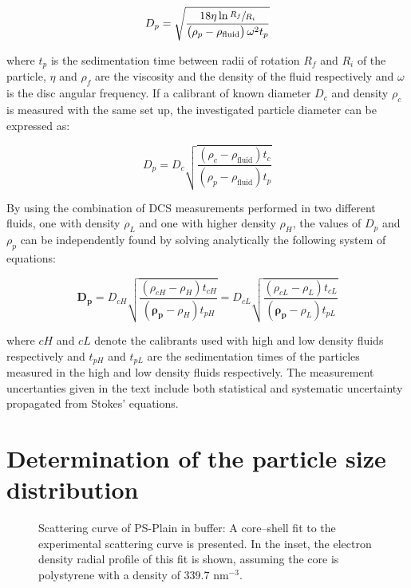 \begin{equation}
D_p=\sqrt{\frac{18\eta\ln\sfrac{R_f}{R_i}}{\left( \rho_p - \rho_{\text{fluid}} \right)\omega^2 t_p}}
\label{eq:stokes}
\end{equation}

where $t_p$ is the sedimentation time between radii of rotation $R_f$ and $R_i$ of the particle, $\eta$ and $\rho_f$ are the viscosity and the density of the fluid respectively and $\omega$ is the disc angular frequency. If a calibrant of known diameter $D_c$ and density $\rho_c$ is measured with the same set up, the investigated particle diameter can be expressed as:

\begin{equation}
D_p=D_c\sqrt{\frac{\left( \rho_c - \rho_{\text{fluid}} \right) t_c}{\left( \rho_p - \rho_{\text{fluid}} \right) t_p}}
\label{eq:software}
\end{equation}

By using the combination of DCS measurements performed in two different fluids, one with density $\rho_L$ and one with higher density $\rho_H$, the values of $D_p$ and $\rho_p$ can be independently found by solving analytically the following system of equations:

\begin{equation}
\bm{D_p} = D_{cH}\sqrt{\frac{\left( \rho_{cH} - \rho_H \right) t_{cH}}{\left( \bm{\rho_p} - \rho_H \right) t_{pH}}} = D_{cL}\sqrt{\frac{\left( \rho_{cL} - \rho_L \right) t_{cL}}{\left( \bm{\rho_p} - \rho_L \right) t_{pL}}}
\label{eq:DCS_sys}
\end{equation}

where $cH$ and $cL$ denote the calibrants used with high and low density fluids respectively and $t_{pH}$ and $t_{pL}$ are the sedimentation times of the particles measured in the high and low density fluids respectively. The measurement uncertanties given in the text include both statistical and systematic uncertainty propagated from Stokes' equations.

\section{Determination of the particle size distribution}
\label{sec:size_validation}

\begin{figure}
	\begin{center}
		
	\end{center}
	\caption[Scattering curve of PS-Plain in buffer.]{Scattering curve of PS-Plain in buffer: A core–shell fit to the experimental scattering curve is presented. In the inset, the electron density radial profile of this fit is shown, assuming the core is polystyrene with a density of 339.7 nm$^{-3}$.}
	\label{fig:PSPlainSingleContrastSAXS}
\end{figure}

